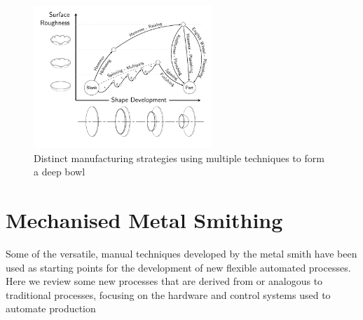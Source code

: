 \begin{figure}[h]
    \centering
    \includegraphics[width=0.6\textwidth]{Images/Bowlv2.pdf}
    \caption{Distinct manufacturing strategies using multiple techniques to form a deep bowl}
    \label{fig:ShapeDevBow}
\end{figure}




\newpage
\section{Mechanised Metal Smithing} \label{sec:Mechanised}

Some of the versatile, manual techniques developed by the metal smith have been used as starting points for the development of new flexible automated processes. Here we review some new processes that are derived from or analogous to traditional processes, focusing on the hardware and control systems used to automate production


